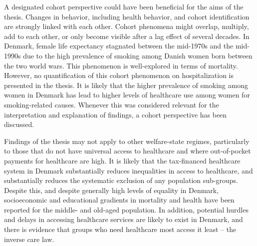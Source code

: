 A designated cohort perspective could have been beneficial for the aims 
of the thesis. Changes in behavior, including health behavior, and cohort 
identification are strongly linked with each other.\citep{ryder1965cohort} 
Cohort phenomena might overlap, multiply, add to each other, or only become 
visible after a lag effect of several decades.\citep{hobcraft1985age} 
In Denmark, female life expectancy stagnated between the mid-1970s and 
the mid-1990s due to the high prevalence of smoking among Danish women 
born between the two world wars.\citep{jacobsen2004women,lindahl2016did} 
This phenomenon is well-explored in terms of mortality. However, no 
quantification of this cohort phenomenon on hospitalization is presented 
in the thesis. It is likely that the higher prevalence of smoking among 
women in Denmark has lead to higher levels of healthcare use among women 
for smoking-related causes. Whenever this was considered relevant for the 
interpretation and explanation of findings, a cohort perspective has 
been discussed.

Findings of the thesis may not apply to other welfare-state regimes, 
particularly to those that do not have universal access to healthcare 
and where out-of-pocket payments for healthcare are high. It is likely 
that the tax-financed healthcare system in Denmark substantially reduces 
inequalities in access to healthcare, and substantially reduces the 
systematic exclusion of any population sub-groups.\citep{juul2012denmark,
vrangbaek2005health} Despite this, and despite generally high levels 
of equality in Denmark, socioeconomic and educational gradients in 
mortality and health have been reported for the middle- and old-aged 
population.\citep{bronnum2000socioeconomic,bronnum2007increasing,
hoffmann2011socioeconomic,bronnum2012widening,christensen2014addressing} 
In addition, potential hurdles and delays in accessing healthcare 
services are likely to exist in Denmark, and there is evidence that 
groups who need healthcare most access it least\citep{gundgaard2006income,
olesen2009delay,lange2014socioeconomic,sortso2017socioeconomic} -- 
the inverse care law.\citep{dalton2008social,starfield2005contribution,
watt2002inverse}

